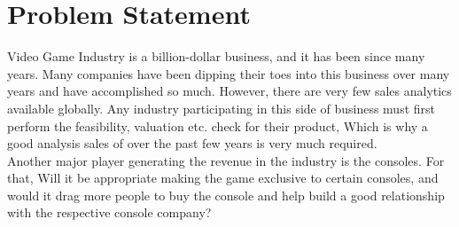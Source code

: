 \documentclass[conference]{IEEEtran}
\begin{document}
\section{Problem Statement}
Video Game Industry is a billion-dollar business, and it has been since many years. Many companies have been dipping their toes into this business over many years and have accomplished so much. However, there are very few sales analytics available globally. Any industry participating in this side of business must first perform the feasibility, valuation etc. check for their product, Which is why a good analysis sales of over the past few years is very much required.\\
Another major player generating the revenue in the industry is the consoles. For that, Will it be appropriate making the game exclusive to certain consoles, and would it drag more people to buy the console and help build a good relationship with the respective console company?
\end{document}
